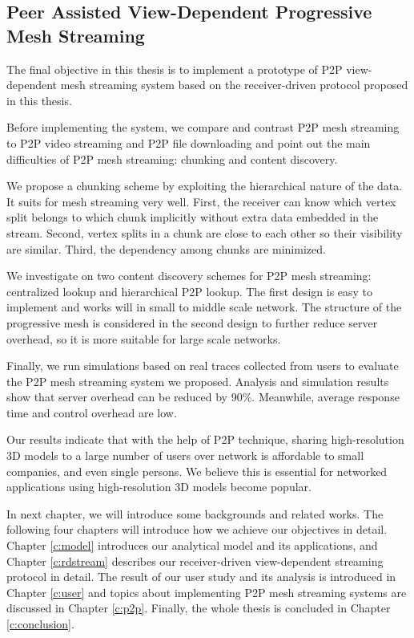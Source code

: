 \documentclass[11pt, a4paper]{report}
\begin{document}
    \subsection{Peer Assisted View-Dependent Progressive Mesh Streaming}
    The final objective in this thesis is to implement a prototype of 
    P2P view-dependent mesh streaming system
    based on the receiver-driven protocol proposed in this thesis.
    
    Before implementing the system, 
    we compare and contrast P2P mesh streaming to P2P
    video streaming and P2P file downloading and point out
    the main difficulties of P2P mesh streaming:  
    chunking and content discovery.

    We propose a chunking scheme by exploiting the hierarchical 
    nature of the data. It suits for mesh streaming very well.
    First, the receiver can know which vertex split belongs to
    which chunk implicitly without extra data embedded in the stream.
    Second, vertex splits in a chunk are close to each other so
    their visibility are similar. Third, the dependency among chunks
    are minimized.

    We investigate on two content discovery schemes for P2P
    mesh streaming: centralized lookup and hierarchical P2P lookup.
    The first design is easy to implement and works will in small to 
    middle scale network. The structure of the progressive
    mesh is considered in the second design to further
    reduce server overhead, so it is more suitable for large scale networks. 
    
    Finally, we run simulations based on real
    traces collected from users to evaluate the P2P
    mesh streaming system we proposed.  Analysis and
    simulation results show that server overhead can be
    reduced by 90\%. Meanwhile,  average response time and
    control overhead are low.

    Our results indicate that with the help of P2P technique,
    sharing high-resolution
    3D models to a large number of users over network is affordable
    to small companies, and even single persons. We believe this is
    essential for networked applications using high-resolution 3D models
    become popular.

    In next chapter, we will introduce some backgrounds and related works.
    The following four chapters will introduce how we achieve our objectives in detail.
    Chapter \ref{c:model} introduces our analytical model and its applications, and
    Chapter \ref{c:rdstream} describes our receiver-driven view-dependent streaming
    protocol in detail. The result of our user study and its analysis is introduced
    in Chapter \ref{c:user} and topics about implementing P2P mesh streaming systems
    are discussed in Chapter \ref{c:p2p}. Finally, the whole thesis is concluded in
    Chapter \ref{c:conclusion}.
\end{document}
